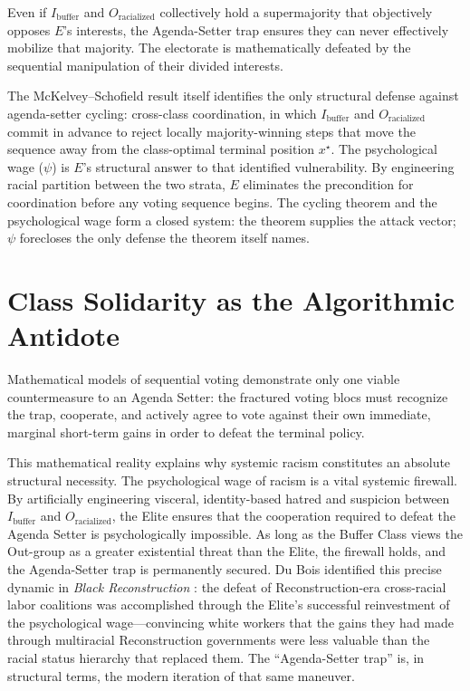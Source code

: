 Even if $I_{\text{buffer}}$ and $O_{\text{racialized}}$ collectively hold a supermajority that objectively opposes $E$'s interests, the Agenda-Setter trap ensures they can never effectively mobilize that majority. The electorate is mathematically defeated by the sequential manipulation of their divided interests.

The McKelvey--Schofield result itself identifies the only structural defense against agenda-setter cycling: cross-class coordination, in which $I_{\text{buffer}}$ and $O_{\text{racialized}}$ commit in advance to reject locally majority-winning steps that move the sequence away from the class-optimal terminal position $x^\star$. The psychological wage ($\psi$) is $E$'s structural answer to that identified vulnerability. By engineering racial partition between the two strata, $E$ eliminates the precondition for coordination before any voting sequence begins. The cycling theorem and the psychological wage form a closed system: the theorem supplies the attack vector; $\psi$ forecloses the only defense the theorem itself names.
\section{Class Solidarity as the Algorithmic Antidote}

Mathematical models of sequential voting demonstrate only one viable countermeasure to an Agenda Setter: the fractured voting blocs must recognize the trap, cooperate, and actively agree to vote against their own immediate, marginal short-term gains in order to defeat the terminal policy.

This mathematical reality explains why systemic racism constitutes an absolute structural necessity. The psychological wage of racism is a vital systemic firewall. By artificially engineering visceral, identity-based hatred and suspicion between $I_{\text{buffer}}$ and $O_{\text{racialized}}$, the Elite ensures that the cooperation required to defeat the Agenda Setter is psychologically impossible. As long as the Buffer Class views the Out-group as a greater existential threat than the Elite, the firewall holds, and the Agenda-Setter trap is permanently secured. Du Bois identified this precise dynamic in \textit{Black Reconstruction} \cite{dubois}: the defeat of Reconstruction-era cross-racial labor coalitions was accomplished through the Elite's successful reinvestment of the psychological wage---convincing white workers that the gains they had made through multiracial Reconstruction governments were less valuable than the racial status hierarchy that replaced them. The ``Agenda-Setter trap'' is, in structural terms, the modern iteration of that same maneuver.
